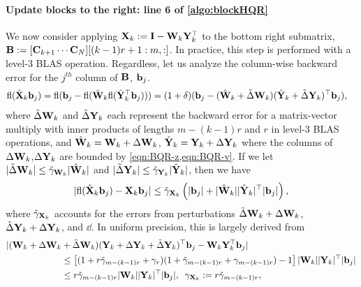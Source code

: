 \paragraph{Update blocks to the right: line 6 of \cref{algo:blockHQR}}
We now consider applying $\mathbf{X}_{k}:=\mathbf{I}-\mathbf{W}_k\mathbf{Y}_k^{\top}$ to the bottom right submatrix, $\mathbf{B}:=[\mathbf{C}_{k+1}\cdots \mathbf{C}_{N}][(k-1)r+1:m,:]$.
In practice, this step is performed with a level-3 BLAS operation. 
Regardless, let us analyze the column-wise backward error for the $j^{th}$ column of $\mathbf{B}$, $\mathbf{b}_{j}$.
\begin{align*}
\mathrm{fl}(\hat{\mathbf{X}}_{k}\mathbf{b}_{j})=\mathrm{fl}(\mathbf{b}_{j} - \mathrm{fl}(\hat{\mathbf{W}}_{k}\mathrm{fl}(\hat{\mathbf{Y}}_{k}^{\top}\mathbf{b}_{j}))) & =(1+\delta)(\mathbf{b}_{j} - (\hat{\mathbf{W}}_{k} + \tilde{\Delta} \mathbf{W}_{k}) (\hat{\mathbf{Y}}_{k} + \tilde{\Delta} \mathbf{Y}_{k})^{\top}\mathbf{b}_{j}),
\end{align*}
where $\tilde{\Delta} \mathbf{W}_{k}$ and $\tilde{\Delta} \mathbf{Y}_{k}$ each represent the backward error for a matrix-vector multiply with inner products of lengths $m-(k-1)r$ and $r$ in level-3 BLAS operations, and $\hat{\mathbf{W}}_{k} = \mathbf{W}_{k}+\Delta \mathbf{W}_{k}$, $\hat{\mathbf{Y}}_{k} = \mathbf{Y}_{k}+\Delta \mathbf{Y}_{k}$ where the columns of $\Delta \mathbf{W}_{k}$,$\Delta \mathbf{Y}_{k}$ are bounded by \cref{eqn:BQR-z,eqn:BQR-v}.
If we let $|\tilde{\Delta} \mathbf{W}_{k}| \leq \tilde{\gamma}_{\mathbf{W}_{k}}|\hat{\mathbf{W}}_{k}|$ and $|\tilde{\Delta} \mathbf{Y}_{k}| \leq \tilde{\gamma}_{\mathbf{Y}_{k}}|\hat{\mathbf{Y}}_{k}|$, then we have 
\begin{equation*}
|\mathrm{fl}(\hat{\mathbf{X}}_{k}\mathbf{b}_j) - \mathbf{X}_k\mathbf{b}_j| \leq \tilde{\gamma}_{\mathbf{X}_{k}}\left(|\mathbf{b}_j|+|\hat{\mathbf{W}}_k||\hat{\mathbf{Y}}_k|^{\top}|\mathbf{b}_j|\right),
\end{equation*}
where $\tilde{\gamma}_{\mathbf{X}_{k}}$ accounts for the errors from perturbations $\tilde{\Delta}\mathbf{W}_k+\Delta \mathbf{W}_k$, $\tilde{\Delta}\mathbf{Y}_k + \Delta \mathbf{Y}_k$, and $\dd$.
In uniform precision, this is largely derived from 
\begin{align*}
|(\mathbf{W}_{k} +\Delta \mathbf{W}_{k} &+ \tilde{\Delta} \mathbf{W}_{k}) (\mathbf{Y}_{k} + \Delta \mathbf{Y}_{k} + \tilde{\Delta} \mathbf{Y}_{k})^{\top}\mathbf{b}_j - \mathbf{W}_{k} \mathbf{Y}_{k}^{\top}\mathbf{b}_j| \\
&\leq \left[(1+r\tilde{\gamma}_{m-(k-1)r}+ \gamma_{r})(1 + \tilde{\gamma}_{m-(k-1)r}+ \gamma_{m-(k-1)r})-1\right]|\mathbf{W}_k||\mathbf{Y}_k|^{\top}|\mathbf{b}_j| \\ 
&\leq r\tilde{\gamma}_{m-(k-1)r}|\mathbf{W}_k||\mathbf{Y}_k|^{\top}|\mathbf{b}_j|,\;\; \gamma_{\mathbf{X}_{k}}:= r\tilde{\gamma}_{m-(k-1)r},
\end{align*}
